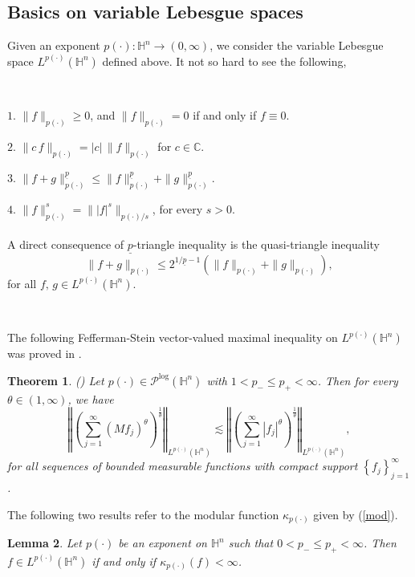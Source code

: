 \documentclass[oneside,10pt]{article}
\newtheorem{theorem}{Theorem}
\newtheorem{lemma}[theorem]{Lemma}
\begin{document}
\subsection{Basics on variable Lebesgue spaces}

Given an exponent $p(\cdot): \mathbb{H}^{n} \rightarrow (0, \infty)$, we consider the variable Lebesgue space $L^{p(\cdot)}(\mathbb{H}^{n})$ defined above. It not so hard to see the following,

\

$1.$ $\| f \|_{p(\cdot)} \geq 0$, and $\| f \|_{p(\cdot)}=0$ if and only if $f \equiv 0$.

$2.$ $\| c \, f \|_{p(\cdot)} = |c| \, \| f \|_{p(\cdot)}$ for $c \in \mathbb{C}$.

$3.$ $\| f + g \|_{p(\cdot)}^{\underline{p}} \leq \| f \|_{p(\cdot)}^{\underline{p}} + \| g \|_{p(\cdot)}^{\underline{p}}$. 

$4.$ $\| f \|_{p(\cdot)}^s = \| |f|^s \|_{p(\cdot)/s}$, for every $s > 0$. \\
$\,\,$ \\
A direct consequence of $\underline{p}$-triangle inequality is the quasi-triangle inequality
$$\| f + g \|_{p(\cdot)} \leq 2^{1/\underline{p} - 1}\left(\| f \|_{p(\cdot)} + \| g \|_{p(\cdot)}\right),$$
for all $f, \, g \in L^{p(\cdot)}(\mathbb{H}^{n})$.

\

The following Fefferman-Stein vector-valued maximal inequality on $L^{p(\cdot)}(\mathbb{H}^{n})$ was proved in \cite{Fang}.

\begin{theorem} (\cite[Theorem 4.2]{Fang}) \label{vector max ineq}
Let $p(\cdot) \in \mathcal{P}^{\log}(\mathbb{H}^n)$ with $1 < p_{-} \leq p_{+} < \infty$. Then for every $\theta \in
\left( 1,\infty \right)$, we have
\[
\left\Vert \left( \sum\limits_{j=1}^{\infty }\left( M f_{j}\right)
^{\theta }\right) ^{\frac{1}{\theta }}\right\Vert_{L^{p(\cdot)}(\mathbb{H}^{n})} \lesssim \left\Vert
\left( \sum\limits_{j=1}^{\infty }\left\vert f_{j}\right\vert ^{\theta
}\right) ^{\frac{1}{\theta }}\right\Vert_{L^{p(\cdot)}(\mathbb{H}^{n})},
\]%
for all sequences of bounded measurable functions with compact support $\left\{ f_{j}\right\}
_{j=1}^{\infty}$.
\end{theorem}

The following two results refer to the modular function $\kappa_{p(\cdot)}$ given by (\ref{mod}).

\begin{lemma} \label{modular} Let $p(\cdot)$ be an exponent on $\mathbb{H}^n$ such that $0 < p_{-} \leq p_{+} < \infty$. Then 
$f \in L^{p(\cdot)}(\mathbb{H}^{n})$ if and only if $\kappa_{p(\cdot)}(f) < \infty$.
\end{lemma}
\end{document}
